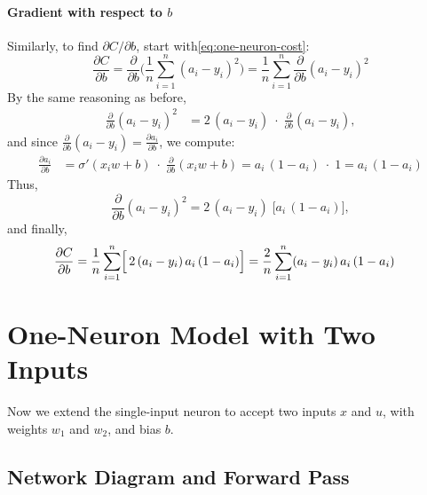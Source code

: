 \documentclass{article}
\begin{document}
\paragraph{Gradient with respect to \(b\)\\}\label{sec:grad-b-one-neuron}

\noindent Similarly, to find \(\partial C / \partial b\), start with\eqref{eq:one-neuron-cost}:
\[
    \frac{\partial C}{\partial b}
    = \frac{\partial}{\partial b} \biggl(\frac{1}{n}\sum_{i=1}^{n}{(a_i - y_i)}^2\biggr)
    = \frac{1}{n} \sum_{i=1}^{n} \frac{\partial}{\partial b}{(a_i - y_i)}^2
\]
By the same reasoning as before,
\begin{align}
    \frac{\partial}{\partial b} {(a_i - y_i)}^2
    &= 2\,(a_i - y_i)\;\cdot\;\frac{\partial}{\partial b}(a_i - y_i),
    \label{eq:one-grad-b-step1}
\end{align}
and since \(\frac{\partial}{\partial b}(a_i - y_i) = \frac{\partial a_i}{\partial b}\), we compute:
\begin{align}
    \frac{\partial a_i}{\partial b}
    &= \sigma'(x_i w + b)\;\cdot\;\frac{\partial}{\partial b}(x_i w + b)
    = a_i\,(1 - a_i)\;\cdot\; 1
    = a_i\,(1 - a_i)
    \label{eq:one-grad-b-step2}
\end{align}
Thus,
\[
    \frac{\partial}{\partial b} {(a_i - y_i)}^2
    = 2\,(a_i - y_i)\;\bigl[a_i\,(1 - a_i)\bigr],
\]
and finally,
\begin{align}
    \frac{\partial C}{\partial b}
    &= \frac{1}{n} \sum_{i=1}^{n} \Bigl[\,2\,(a_i - y_i)\,a_i\,(1 - a_i)\Bigr]
    = \frac{2}{n} \sum_{i=1}^{n} (a_i - y_i)\,a_i\,(1 - a_i)
    \label{eq:one-grad-b-final}
\end{align}

\section{One-Neuron Model with Two Inputs}

\noindent Now we extend the single-input neuron to accept two inputs \(x\) and \(u\), with weights \(w_1\) and \(w_2\), and bias \(b\).  

\subsection{Network Diagram and Forward Pass}\label{sec:one-neuron-two-inputs}
\end{document}
